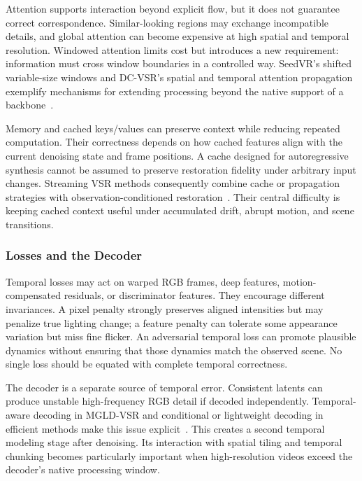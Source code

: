 Attention supports interaction beyond explicit flow, but it does not guarantee correct correspondence. Similar-looking regions may exchange incompatible details, and global attention can become expensive at high spatial and temporal resolution. Windowed attention limits cost but introduces a new requirement: information must cross window boundaries in a controlled way. SeedVR's shifted variable-size windows and DC-VSR's spatial and temporal attention propagation exemplify mechanisms for extending processing beyond the native support of a backbone~\cite{seedvr,dcvsr}.

Memory and cached keys/values can preserve context while reducing repeated computation. Their correctness depends on how cached features align with the current denoising state and frame positions. A cache designed for autoregressive synthesis cannot be assumed to preserve restoration fidelity under arbitrary input changes. Streaming VSR methods consequently combine cache or propagation strategies with observation-conditioned restoration~\cite{stream,infvsr,flash}. Their central difficulty is keeping cached context useful under accumulated drift, abrupt motion, and scene transitions.

\subsubsection{Losses and the Decoder}
Temporal losses may act on warped RGB frames, deep features, motion-compensated residuals, or discriminator features. They encourage different invariances. A pixel penalty strongly preserves aligned intensities but may penalize true lighting change; a feature penalty can tolerate some appearance variation but miss fine flicker. An adversarial temporal loss can promote plausible dynamics without ensuring that those dynamics match the observed scene. No single loss should be equated with complete temporal correctness.

The decoder is a separate source of temporal error. Consistent latents can produce unstable high-frequency RGB detail if decoded independently. Temporal-aware decoding in MGLD-VSR and conditional or lightweight decoding in efficient methods make this issue explicit~\cite{mgld,flash}. This creates a second temporal modeling stage after denoising. Its interaction with spatial tiling and temporal chunking becomes particularly important when high-resolution videos exceed the decoder's native processing window.


